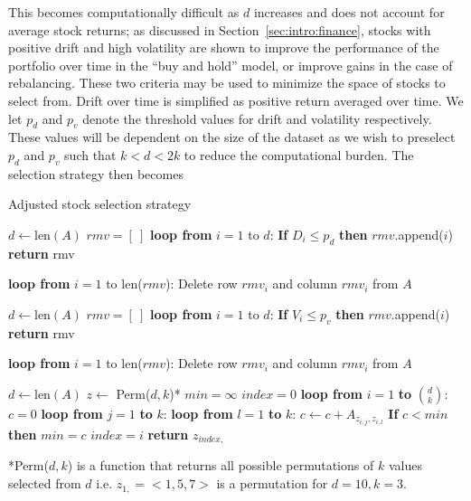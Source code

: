 \noindent This becomes computationally difficult as $d$ increases and does not 
account for average stock returns; as discussed in 
Section~\ref{sec:intro:finance}, 
stocks with positive drift and high volatility are shown to improve the 
performance of the portfolio over time in the ``buy and hold'' model, or 
improve gains in the case of rebalancing. These two criteria may be used to 
minimize the space of stocks to select from. Drift over time is simplified as 
positive return averaged over time. We let $p_d$ and $p_v$ denote the threshold 
values for drift and volatility respectively. These values will be dependent on 
the size of the dataset as we wish to preselect $p_d$ and $p_v$ such that 
$k<d<2k$ to reduce the computational burden. The selection strategy then becomes

\tablespacing
\begin{algorithm}[H]
	\caption{Adjusted stock selection strategy}\label{alg:usage:stockselection2}
	\begin{algorithmic}[1]
		
		\State $d \gets \text{len}(A)$
		\State $rmv = [\ ]$
		\State \textbf{loop from} $i = 1$ to $d$:
		\State \indent \textbf{If} $D_i \leq p_d$ \textbf{then} 
		$rmv$.append($i$)
		\State \textbf{return} rmv
		\EndFunction
		
		\State \textbf{loop from} $i=1$ to len($rmv$):
		\State \indent Delete row $rmv_i$ and column $rmv_i$ from $A$
		
		\State $d \gets \text{len}(A)$
		\State $rmv = [\ ]$
		\State \textbf{loop from} $i = 1$ to $d$:
		\State \indent \textbf{If} $V_i \leq p_v$ \textbf{then} 
		$rmv$.append($i$)
		\State \textbf{return} rmv
		\EndFunction
		
		\State \textbf{loop from} $i=1$ to len($rmv$):
		\State \indent Delete row $rmv_i$ and column $rmv_i$ from $A$
		
		\State $d \gets \text{len}(A)$
		\State $z \gets$ Perm($d,k$)*
		\State $min = \infty$
		\State $index = 0$
		\State \textbf{loop from} $i=1$ \textbf{to} $d \choose k$:
		\State \indent $c = 0$
		\State \indent \textbf{loop from} $j = 1$ \textbf{to} $k$:
		\State \indent \indent \textbf{loop from} $l=1$ \textbf{to} $k$:
		\State \indent \indent \indent $c \gets c+A_{z_{i,j},z_{i,l}}$
		\State \indent \textbf{If} $c < min$ \textbf{then}
		\State \indent \indent $min = c$
		\State \indent \indent $index = i$
		\State \textbf{return} $z_{index,}$
		\EndFunction
		\EndProcedure
	\end{algorithmic}
	*Perm($d,k$) is a function that returns all possible permutations 
	of $k$ values selected from $d$ i.e. $z_{1,}=<1,5,7>$ is a permutation for 
	$d=10,k=3$.
\end{algorithm}
\bodyspacing